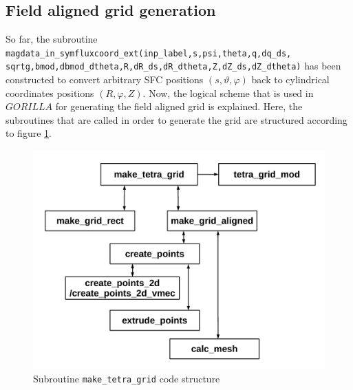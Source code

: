 \documentclass[./main.tex]{subfiles}
\begin{document}
\subsection{Field aligned grid generation}
So far, the subroutine \texttt{magdata\_in\_symfluxcoord\_ext(inp\_label,s,psi,theta,q,dq\_ds,\\sqrtg,bmod,dbmod\_dtheta,R,dR\_ds,dR\_dtheta,Z,dZ\_ds,dZ\_dtheta)} has been constructed to convert arbitrary SFC positions $(s,\vartheta,\varphi)$ back to cylindrical coordinates positions $(R,\varphi,Z)$. Now, the logical scheme that is used in $GORILLA$ for generating the field aligned grid is explained. Here, the subroutines that are called in order to generate the grid are structured according to figure \ref{fig:make_tetra_grid_code_structure}. 

\begin{figure}[H]
	\includegraphics[width=1.0\textwidth]{figures/make_tetra_grid_graphics.pdf}
	\caption{Subroutine \texttt{make\_tetra\_grid} code structure}
	\label{fig:make_tetra_grid_code_structure}
\end{figure}
\end{document}
